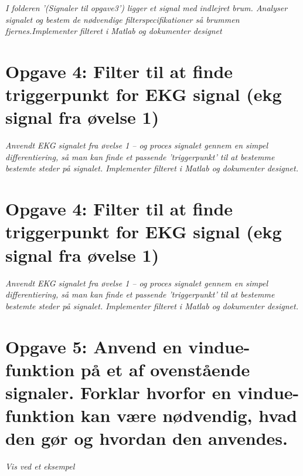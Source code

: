 \documentclass[a4paper]{report}
\begin{document}
\textit{I folderen '(Signaler til opgave3') ligger et signal med indlejret brum. Analyser signalet og bestem de nødvendige filterspecifikationer så brummen fjernes.Implementer filteret i Matlab og dokumenter designet}\\

\section*{Opgave 4: Filter til at finde triggerpunkt for EKG signal (ekg signal fra øvelse 1)}
\textit{Anvendt EKG signalet fra øvelse 1 – og proces signalet gennem en simpel  differentiering, så man kan finde et passende ’triggerpunkt’ til at bestemme bestemte steder på signalet. Implementer filteret i Matlab og dokumenter designet.}\\

\section*{Opgave 4: Filter til at finde triggerpunkt for EKG signal (ekg signal fra øvelse 1)}
\textit{Anvendt EKG signalet fra øvelse 1 – og proces signalet gennem en simpel  differentiering, så man kan finde et passende ’triggerpunkt’ til at bestemme bestemte steder på signalet. Implementer filteret i Matlab og dokumenter designet.
}\\

\section*{Opgave 5: Anvend en vindue-funktion på et af ovenstående signaler. Forklar hvorfor en vindue-funktion kan være nødvendig, hvad den gør og hvordan den anvendes.}
\textit{Vis ved et eksempel}\\
\end{document}

